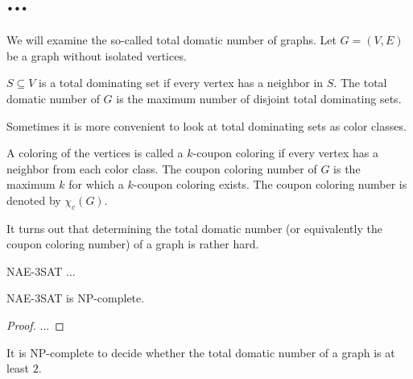 \section{...}

We will examine the so-called total domatic number of graphs.
Let $G = (V, E)$ be a graph without isolated vertices.

\begin{definition}
  $S \subseteq V$ is a total dominating set if every vertex has a neighbor in
  $S$. The total domatic number of $G$ is the maximum number of disjoint total
  dominating sets.
\end{definition}

Sometimes it is more convenient to look at total dominating sets as color classes.

\begin{definition}
  A coloring of the vertices is called a $k$-coupon coloring if every vertex
  has a neighbor from each color class. The coupon coloring number of $G$ is
  the maximum $k$ for which a $k$-coupon coloring exists. The coupon coloring
  number is denoted by $\chi_c(G)$.
\end{definition}

It turns out that determining the total domatic number (or equivalently the
coupon coloring number) of a graph is rather hard.

\begin{definition}
  NAE-3SAT ...
\end{definition}

\begin{thm}
  NAE-3SAT is NP-complete.
\end{thm}

\begin{proof}
  ...
\end{proof}

\begin{thm}
  It is NP-complete to decide whether the total domatic number of
  a graph is at least $2$.
\end{thm}

